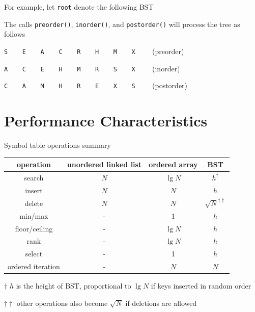 \documentclass[8pt,a4paper,compress]{beamer}
\begin{document}
\begin{frame}[fragile]
\pause

For example, let \lstinline{root} denote the following BST
\begin{center}
\end{center}

\pause
\bigskip

The calls \lstinline{preorder()}, \lstinline{inorder()}, and \lstinline{postorder()} will process the tree as follows

\bigskip

\lstinline{S    E    A    C    R    H    M    X    } (preorder)

\bigskip

\lstinline{A    C    E    H    M    R    S    X    } (inorder)

\bigskip

\lstinline{C    A    M    H    R    E    X    S    } (postorder)
\end{frame}

\section{Performance Characteristics}
\begin{frame}[fragile]
\pause

Symbol table operations summary
\begin{center}
\begin{tabular}{cccc}
operation & unordered linked list & ordered array & BST \\ \hline
search & $N$ & $\lg N$ & $h^\dagger$ \\
insert & $N$ & $N$ & $h$ \\
delete & $N$ & $N$ & $\sqrt{N}^{\dagger\dagger}$ \\
min/max & - & 1 & $h$ \\
floor/ceiling & - & $\lg N$ & $h$\\
rank & - & $\lg N$ & $h$ \\
select & - & 1 & $h$ \\
ordered iteration & - & $N$ & $N$ 
\end{tabular} 

\bigskip

\tiny $\dagger$ $h$ is the height of BST, proportional to $\lg N$ if keys inserted in random order

$\dagger\dagger$ other operations also become $\sqrt{N}$ if deletions are allowed
\end{center}
\end{frame}
\end{document}
